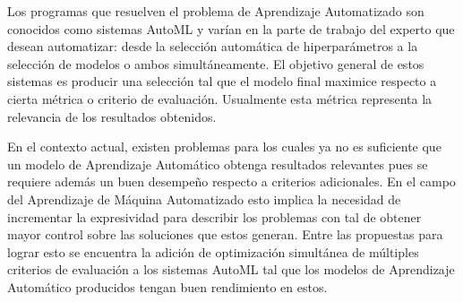 



Los programas que resuelven el problema de Aprendizaje Automatizado son conocidos como sistemas AutoML y var\'ian en la parte de trabajo del experto que desean automatizar: desde la selecci\'on autom\'atica de hiperpar\'ametros  a la selecci\'on de modelos  o ambos  simult\'aneamente. El objetivo general de estos sistemas es producir una selecci\'on tal que el modelo final maximice respecto a cierta m\'etrica o criterio de evaluaci\'on. 
Usualmente esta m\'etrica representa la relevancia de los resultados obtenidos.

En el contexto actual, existen problemas para los cuales ya no es suficiente que un modelo de Aprendizaje Autom\'atico obtenga resultados relevantes pues se requiere adem\'as un buen desempe\~no respecto a criterios adicionales. En el campo del Aprendizaje de M\'aquina Automatizado esto implica la necesidad de incrementar la expresividad para describir los problemas con tal de obtener mayor control sobre las soluciones que estos generan. Entre las propuestas para lograr esto se encuentra la adici\'on de optimizaci\'on simult\'anea de m\'ultiples criterios de evaluaci\'on a los sistemas AutoML  tal que los modelos de Aprendizaje Autom\'atico producidos tengan buen rendimiento en estos.   

